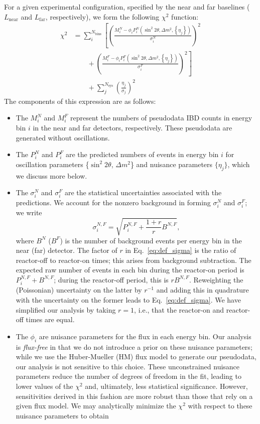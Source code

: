 \documentclass[prd, twocolumn, tightenlines, twoside, secnumarabic, superscriptaddress, preprintnumbers, nofootinbib, notitlepage]{revtex4-1}
\begin{document}
For a given experimental configuration, specified by the near and far baselines ($L_\text{near}$ and $L_\text{far}$, respectively), we form the following $\chi^2$ function:
\begin{align}
    \chi^2 & = \sum_i^{N_\text{bins}} \left[ \left(\frac{M_i^N - \phi_i P_i^N\left(\sin^2 2\theta, \Delta m^2, \left\{ \eta_j \right\} \right)}{\sigma_i^N}\right)^2 \right. \nonumber \\
    & \left. \qquad + \left(\frac{M_i^F - \phi_i P_i^F\left(\sin^2 2\theta, \Delta m^2, \left\{ \eta_j \right\} \right)}{\sigma_i^F}\right)^2 \right] \nonumber \\
    & \qquad + \sum_j^{N_\text{sys}} \left( \frac{\eta_j}{\sigma_j} \right)^2
    \label{eq:chi2}
\end{align}
The components of this expression are as follows:
\begin{itemize}
    \item The $M_i^N$ and $M_i^F$ represent the numbers of pseudodata IBD counts in energy bin $i$ in the near and far detectors, respectively. These pseudodata are generated without oscillations.
    \item The $P_i^N$ and $P_i^F$ are the predicted numbers of events in energy bin $i$ for oscillation parameters \{$\sin^2 2\theta$, $\Delta m^2$\} and nuisance parameters $\{\eta_j\}$, which we discuss more below.
    \item The $\sigma_i^N$ and $\sigma_i^F$ are the statistical uncertainties associated with the predictions. We account for the nonzero background in forming $\sigma_i^N$ and $\sigma_i^F$; we write
    \begin{equation}
        \sigma_i^{N,F} = \sqrt{P_i^{N,F} + \frac{1+r}{r} B^{N,F}},
        \label{eq:def_sigma}
    \end{equation}
    where $B^N$ ($B^F$) is the number of background events per energy bin in the near (far) detector. The factor of $r$ in Eq.~\eqref{eq:def_sigma} is the ratio of reactor-off to reactor-on times; this arises from background subtraction. The expected raw number of events in each bin during the reactor-on period is $P_i^{N,F} + B^{N,F}$; during the reactor-off period, this is $rB^{N,F}$. Reweighting the (Poissonian) uncertainty on the latter by $r^{-1}$ and adding this in quadrature with the uncertainty on the former leads to Eq.~\eqref{eq:def_sigma}.
    We have simplified our analysis by taking $r=1$, i.e., that the reactor-on and reactor-off times are equal.
    \item The $\phi_i$ are nuisance parameters for the flux in each energy bin. Our analysis is \emph{flux-free} in that we do not introduce a prior on these nuisance parameters; while we use the Huber-Mueller (HM) flux model \cite{Mueller:2011nm, Huber:2011wv} to generate our pseudodata, our analysis is not sensitive to this choice. These unconstrained nuisance parameters reduce the number of degrees of freedom in the fit, leading to lower values of the $\chi^2$ and, ultimately, less statistical significance. However, sensitivities derived in this fashion are more robust than those that rely on a given flux model. We may analytically minimize the $\chi^2$ with respect to these nuisance parameters to obtain

\end{itemize}
\end{document}
